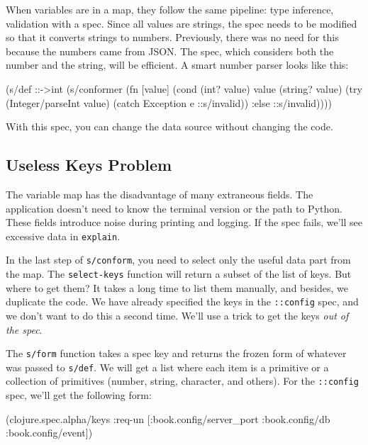 When variables are in a map, they follow the same pipeline: type inference, validation with a spec. Since all values are strings, the spec needs to be modified so that it converts strings to numbers. Previously, there was no need for this because the numbers came from JSON. The spec, which considers both the number and the string, will be efficient. A smart number parser looks like this:

\begin{clojure}
(s/def ::->int
  (s/conformer
   (fn [value]
     (cond
       (int? value) value
       (string? value)
       (try (Integer/parseInt value)
            (catch Exception e
              ::s/invalid))
       :else ::s/invalid))))
\end{clojure}

\noindent
With this spec, you can change the data source without changing the code.

\subsection{Useless Keys Problem}

The variable map has the disadvantage of many extraneous fields. The application doesn't need to know the terminal version or the path to Python. These fields introduce noise during printing and logging. If the spec fails, we'll see excessive data in \verb|explain|.


In the last step of \verb|s/conform|, you need to select only the useful data part from the map. The \verb|select-keys| function will return a subset of the list of keys. But where to get them? It takes a long time to list them manually, and besides, we duplicate the code. We have already specified the keys in the \verb|::config| spec, and we don't want to do this a second time. We'll use a trick to get the keys \emph{out of the spec}.

The \verb|s/form| function takes a spec key and returns the frozen form of whatever was passed to \verb|s/def|. We will get a list where each item is a primitive or a collection of primitives (number, string, character, and others).
For the \verb|::config| spec, we'll get the following form:

\begin{clojure}
(clojure.spec.alpha/keys
 :req-un [:book.config/server_port
          :book.config/db
          :book.config/event])
\end{clojure}

